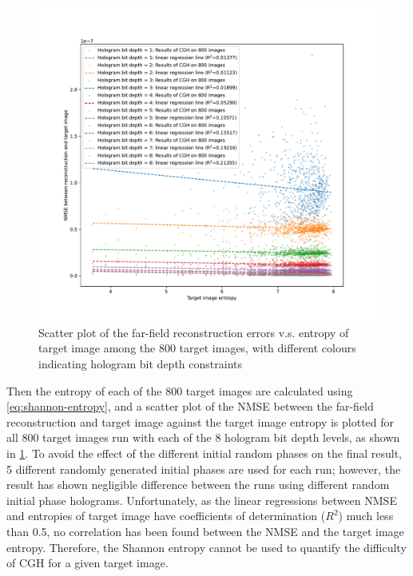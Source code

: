 	\begin{figure} [H]
		\begin{center}
		\includegraphics[trim={50 40 70 70}, clip, width = \textwidth]{GS_Fraunhofer_NMSE_VS_Entropy.pdf}
		\end{center}
		\caption{\label{fig:GS_Fraunhofer_NMSE_VS_Entropy} Scatter plot of the far-field reconstruction errors v.s. entropy of target image among the 800 target images, with different colours indicating hologram bit depth constraints}
	\end{figure}

	Then the entropy of each of the 800 target images are calculated using \cref{eq:shannon-entropy}, and a scatter plot of the NMSE between the far-field reconstruction and target image against the target image entropy is plotted for all 800 target images run with each of the 8 hologram bit depth levels, as shown in \cref{fig:GS_Fraunhofer_NMSE_VS_Entropy}. To avoid the effect of the different initial random phases on the final result, 5 different randomly generated initial phases are used for each run; however, the result \cite{research_data_Sha2024} has shown negligible difference between the runs using different random initial phase holograms.
	Unfortunately, as the linear regressions between NMSE and entropies of target image have coefficients of determination ($R^2$) much less than 0.5, no correlation has been found between the NMSE and the target image entropy. Therefore, the Shannon entropy cannot be used to quantify the difficulty of CGH for a given target image.



